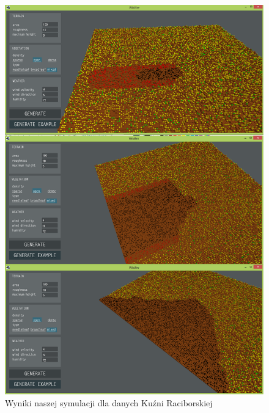 \documentclass[a4paper, 11pt]{article}
\begin{document}
	\begin{figure}[H]
		\centerline{\includegraphics[scale=0.4]{kuzniatest}}
		\raggedright{	\caption{Wyniki naszej symulacji dla danych Kuźni Raciborskiej}}
	\end{figure}
	
	
\end{document}
